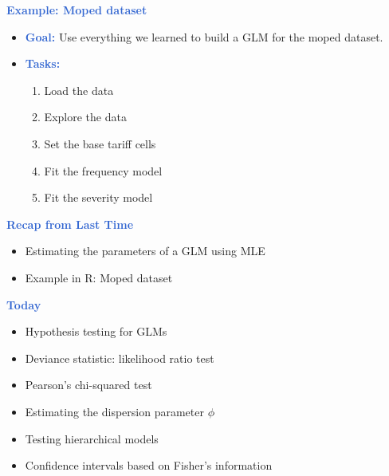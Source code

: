 \documentclass[aspectratio=169,professionalfonts,mathserif]{beamer}
\newcommand{\highlight}[1]{\textcolor{Highlight}{\bf #1}}
\renewcommand{\(}{\left(}
\renewcommand{\)}{\right)}
\renewcommand{\[}{\left[}
\renewcommand{\]}{\right]}
\newcommand{\mytitle}[1]{\vspace*{-1mm}%
  \centerline{\highlight{\Large #1}}\vspace*{3mm}}
\newenvironment{slidebox}{%
  \begin{minipage}[c][7.5cm][t]{14.4cm}\raggedright}{%
  \end{minipage}}
\begin{document}
\begin{frame}\begin{slidebox}
  \mytitle{Example: Moped dataset}
  
  \begin{itemize}
      \item \highlight{Goal:} Use everything we learned to build a GLM for the moped dataset.
      \pause
      \item \highlight{Tasks:}
      \begin{enumerate}
        \item Load the data
        \pause
        \item Explore the data
        \pause
        \item Set the base tariff cells
        \pause
        \item Fit the frequency model
        \pause
        \item Fit the severity model
      \end{enumerate}
  \end{itemize}
\end{slidebox}\end{frame}

\begin{frame}\begin{slidebox}
  \mytitle{Recap from Last Time}
  
  \begin{itemize}
      \item   Estimating the parameters of a GLM using MLE
      \pause
      \item   Example in R: Moped dataset
  \end{itemize}
\end{slidebox}\end{frame}

\begin{frame}\begin{slidebox}
  \mytitle{Today}
  
  \begin{itemize}
      \item Hypothesis testing for GLMs
      \pause
      \item Deviance statistic: likelihood ratio test 
      \pause
      \item Pearson's chi-squared test
      \pause
      \item Estimating the dispersion parameter $\phi$
      \pause
      \item Testing hierarchical models
      \pause
      \item Confidence intervals based on Fisher's information
  \end{itemize}
\end{slidebox}\end{frame}
\end{document}
